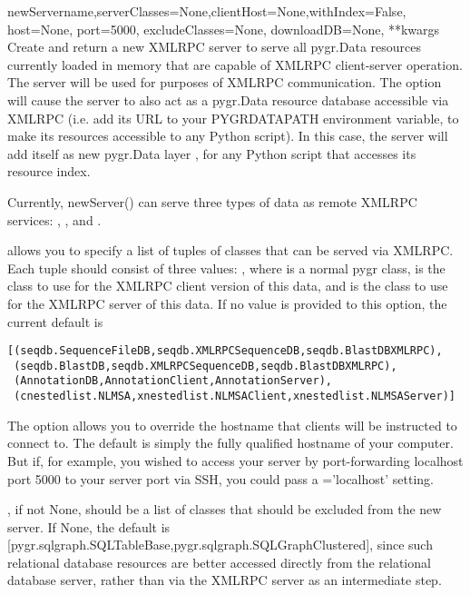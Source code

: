 \documentclass{howto}
\begin{document}
\begin{funcdesc}{newServer}{name,serverClasses=None,clientHost=None,withIndex=False, host=None, port=5000, excludeClasses=None, downloadDB=None, **kwargs}
  Create and return a new XMLRPC server to serve all pygr.Data resources 
  currently loaded in memory that are capable of XMLRPC client-server
  operation.  The server  will be used for 
  purposes of XMLRPC communication.  The  option
  will cause the server to also act as a pygr.Data resource database
  accessible via XMLRPC (i.e. add its URL to your PYGRDATAPATH environment
  variable, to make its resources accessible to any Python script).
  In this case, the server will add itself as new pygr.Data layer
  , for any Python script that accesses its resource index.

  Currently, newServer() can serve three types of data as remote
  XMLRPC services: , , and .

   allows you to specify a list of tuples of
  classes that can be served via XMLRPC.  Each tuple should consist of
  three values: , where 
   is a normal pygr class,  is the 
  class to use for the XMLRPC client version of this data, and
   is the class to use for the XMLRPC server of
  this data.  If no value is provided to this option, the current
  default is 
\begin{verbatim}
[(seqdb.SequenceFileDB,seqdb.XMLRPCSequenceDB,seqdb.BlastDBXMLRPC),
 (seqdb.BlastDB,seqdb.XMLRPCSequenceDB,seqdb.BlastDBXMLRPC),
 (AnnotationDB,AnnotationClient,AnnotationServer),
 (cnestedlist.NLMSA,xnestedlist.NLMSAClient,xnestedlist.NLMSAServer)] 
\end{verbatim}
  The  option allows you to override the hostname
  that clients will be instructed to connect to.  The default is simply
  the fully qualified hostname of your computer.  But if, for example,
  you wished to access your server by port-forwarding localhost port 5000
  to your server port via SSH, you could pass a ='localhost'
  setting.

  , if not None, should be a list of classes that
  should be excluded from the new server.  If None, the default is
  [pygr.sqlgraph.SQLTableBase,pygr.sqlgraph.SQLGraphClustered], since
  such relational database resources are better accessed directly from
  the relational database server, rather than via the XMLRPC server as
  an intermediate step.


\end{funcdesc}
\end{document}
